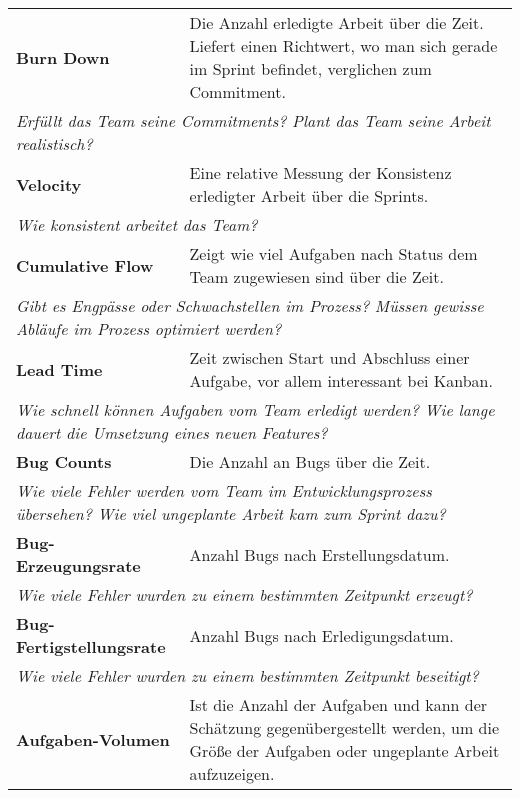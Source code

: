   \begin{table}[H]
    \centering
    \begin{tabular}{p{5cm}p{9.5cm}} \toprule
    \textbf{Burn Down} & Die Anzahl erledigte Arbeit über die Zeit. Liefert einen Richtwert, wo man sich gerade im Sprint befindet, verglichen zum Commitment. \\
    \multicolumn{2}{p{14.5cm}}{\textit{Erfüllt das Team seine Commitments? \newline Plant das Team seine Arbeit realistisch?}} \\ \midrule
    \textbf{Velocity} & Eine relative Messung der Konsistenz erledigter Arbeit über die Sprints. \\
    \multicolumn{2}{p{14.5cm}}{\textit{Wie konsistent arbeitet das Team?}} \\ \midrule
    \textbf{Cumulative Flow} & Zeigt wie viel Aufgaben nach Status dem Team zugewiesen sind über die Zeit. \\
    \multicolumn{2}{p{14.5cm}}{\textit{Gibt es Engpässe oder Schwachstellen im Prozess? \newline Müssen gewisse Abläufe im Prozess optimiert werden?}} \\ \midrule
    \textbf{Lead Time} & Zeit zwischen Start und Abschluss einer Aufgabe, vor allem interessant bei Kanban. \\
    \multicolumn{2}{p{14.5cm}}{\textit{Wie schnell können Aufgaben vom Team erledigt werden? \newline Wie lange dauert die Umsetzung eines neuen Features?}} \\ \midrule
    \textbf{Bug Counts} & Die Anzahl an Bugs über die Zeit. \\
    \multicolumn{2}{p{14.5cm}}{\textit{Wie viele Fehler werden vom Team im Entwicklungsprozess übersehen? \newline Wie viel ungeplante Arbeit kam zum Sprint dazu?}} \\ \midrule
    \textbf{Bug-Erzeugungsrate} & Anzahl Bugs nach Erstellungsdatum. \\
    \multicolumn{2}{p{14.5cm}}{\textit{Wie viele Fehler wurden zu einem bestimmten Zeitpunkt erzeugt?}} \\ \midrule
    \textbf{Bug-Fertigstellungsrate} & Anzahl Bugs nach Erledigungsdatum. \\
    \multicolumn{2}{p{14.5cm}}{\textit{Wie viele Fehler wurden zu einem bestimmten Zeitpunkt beseitigt?}} \\ \midrule
    \textbf{Aufgaben-Volumen} & Ist die Anzahl der Aufgaben und kann der Schätzung gegenübergestellt werden, um die Größe der Aufgaben oder ungeplante Arbeit aufzuzeigen. \\

\end{tabular}
\end{table}
